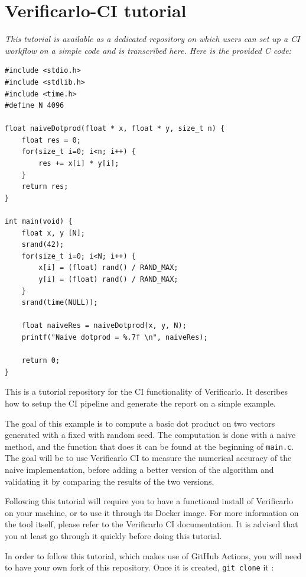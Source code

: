 \newpage
\appendix
\section{Verificarlo-CI tutorial}
\textit{This tutorial is available as a dedicated repository
\cite{vfc_ci_tutorial} on which users can set up a CI workflow on a
simple code and is transcribed here. Here is the provided C code: }

\begin{verbatim}
#include <stdio.h>
#include <stdlib.h>
#include <time.h>
#define N 4096

float naiveDotprod(float * x, float * y, size_t n) {
	float res = 0;
	for(size_t i=0; i<n; i++) {
		res += x[i] * y[i];
	}
	return res;
}

int main(void) {
	float x, y [N];
	srand(42);
	for(size_t i=0; i<N; i++) {
		x[i] = (float) rand() / RAND_MAX;
		y[i] = (float) rand() / RAND_MAX;
	}
	srand(time(NULL));

	float naiveRes = naiveDotprod(x, y, N);
	printf("Naive dotprod = %.7f \n", naiveRes);

	return 0;
}
\end{verbatim}

This is a tutorial repository for the CI functionality of Verificarlo. It describes how to setup the CI pipeline and generate the report on a simple example.

\bigbreak

The goal of this example is to compute a basic dot product on two vectors
generated with a fixed with random seed. The computation is done with a naive
method, and the function that does it can be found at the beginning of \texttt{main.c}.
The goal will be to use Verificarlo CI to measure the numerical accuracy of the
naive implementation, before adding a better version of the algorithm and
validating it by comparing the results of the two versions.

\bigbreak

Following this tutorial will require you to have a functional install of
Verificarlo on your machine, or to use it through its Docker image. For more
information on the tool itself, please refer to the Verificarlo CI
documentation. It is advised that you at least go through it quickly before
doing this tutorial.

In order to follow this tutorial, which makes use of GitHub Actions, you will
need to have your own fork of this repository. Once it is created,
\texttt{git clone} it :

